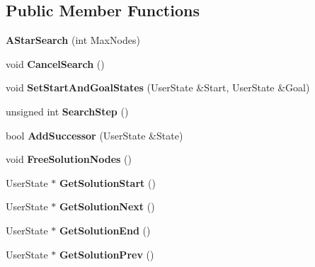 \subsection*{Public Member Functions}
\begin{DoxyCompactItemize}
\item 
\mbox{\label{class_a_star_search_a52e3473ae173add7bee3d760d542c32e}} 
{\bfseries A\+Star\+Search} (int Max\+Nodes)
\item 
\mbox{\label{class_a_star_search_a8b19d7f5e7909fb507bcda61fb34aedb}} 
void {\bfseries Cancel\+Search} ()
\item 
\mbox{\label{class_a_star_search_ab2347a455a7d9dc6a81331a99ce740b5}} 
void {\bfseries Set\+Start\+And\+Goal\+States} (User\+State \&Start, User\+State \&Goal)
\item 
\mbox{\label{class_a_star_search_af123b85f3d35bd92018c0f088e7fd9e5}} 
unsigned int {\bfseries Search\+Step} ()
\item 
\mbox{\label{class_a_star_search_a146c243d29ee57d71efb28d7a386e2f4}} 
bool {\bfseries Add\+Successor} (User\+State \&State)
\item 
\mbox{\label{class_a_star_search_a7249cb4f68ad553c462a3aa4541e9c70}} 
void {\bfseries Free\+Solution\+Nodes} ()
\item 
\mbox{\label{class_a_star_search_a3d0da489caa33f68f960c23d4666bac9}} 
User\+State $\ast$ {\bfseries Get\+Solution\+Start} ()
\item 
\mbox{\label{class_a_star_search_a6af41045ed9f7a2c38d9bd25fb018a62}} 
User\+State $\ast$ {\bfseries Get\+Solution\+Next} ()
\item 
\mbox{\label{class_a_star_search_a57e9abda4fb879a6a62ec97e67283af0}} 
User\+State $\ast$ {\bfseries Get\+Solution\+End} ()
\item 
\mbox{\label{class_a_star_search_af156866aa02dc21d8605bc18ae6b2899}} 
User\+State $\ast$ {\bfseries Get\+Solution\+Prev} ()

\end{DoxyCompactItemize}
